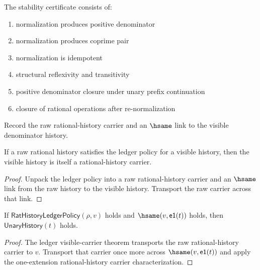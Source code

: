 \begin{definition}
\label{def:rat-stability-certificate}
The stability certificate consists of:
\begin{enumerate}
  \item normalization produces positive denominator
  \item normalization produces coprime pair
  \item normalization is idempotent
  \item structural reflexivity and transitivity
  \item positive denominator closure under unary prefix continuation
  \item closure of rational operations after re-normalization
\end{enumerate}
\end{definition}

\begin{definition}
\label{def:rat-ledger-policy}
Record the raw rational-history carrier and an $\hsame$ link to the visible denominator history.
\end{definition}

\begin{theorem}
\label{thm:rat-ledger-visible-carrier}
If a raw rational history satisfies the ledger policy for a visible history, then the visible history is itself a rational-history carrier.
\end{theorem}
\begin{proof}
Unpack the ledger policy into a raw rational-history carrier and an $\hsame$ link from the raw history to the visible history. Transport the raw carrier across that link.
\end{proof}

\begin{theorem}
\label{thm:rat-ledger-visible-positive-denominator-readback}
If $\mathsf{RatHistoryLedgerPolicy}(\rho,v)$ holds and
$\hsame(v,\mathsf{e1}(t))$ holds, then $\mathsf{UnaryHistory}(t)$ holds.
\end{theorem}
\begin{proof}
The ledger visible-carrier theorem transports the raw rational-history carrier
to $v$. Transport that carrier once more across $\hsame(v,\mathsf{e1}(t))$ and
apply the one-extension rational-history carrier characterization.
\end{proof}

